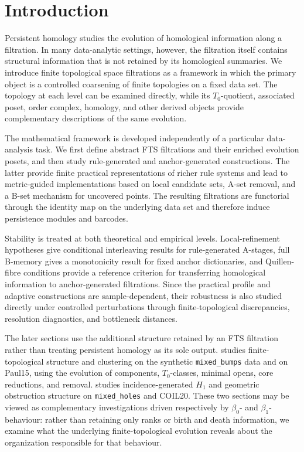 \documentclass[a4paper,11pt]{article}
\theoremstyle{definition}
\theoremstyle{remark}
\begin{document}
\tableofcontents

\section{Introduction}\label{sec:introduction}

Persistent homology studies the evolution of homological information along a filtration. In many data-analytic settings, however, the filtration itself contains structural information that is not retained by its homological summaries. We introduce finite topological space filtrations as a framework in which the primary object is a controlled coarsening of finite topologies on a fixed data set. The topology at each level can be examined directly, while its $T_0$-quotient, associated poset, order complex, homology, and other derived objects provide complementary descriptions of the same evolution.

The mathematical framework is developed independently of a particular data-analysis task. We first define abstract FTS filtrations and their enriched evolution posets, and then study rule-generated and anchor-generated constructions. The latter provide finite practical representations of richer rule systems and lead to metric-guided implementations based on local candidate sets, A-set removal, and a B-set mechanism for uncovered points. The resulting filtrations are functorial through the identity map on the underlying data set and therefore induce persistence modules and barcodes.

Stability is treated at both theoretical and empirical levels. Local-refinement hypotheses give conditional interleaving results for rule-generated A-stages, full B-memory gives a monotonicity result for fixed anchor dictionaries, and Quillen-fibre conditions provide a reference criterion for transferring homological information to anchor-generated filtrations. Since the practical profile and adaptive constructions are sample-dependent, their robustness is also studied directly under controlled perturbations through finite-topological discrepancies, resolution diagnostics, and bottleneck distances.

The later sections use the additional structure retained by an FTS filtration rather than treating persistent homology as its sole output.  studies finite-topological structure and clustering on the synthetic \texttt{mixed\_bumps} data and on Paul15, using the evolution of components, $T_0$-classes, minimal opens, core reductions, and removal.  studies incidence-generated $H_1$ and geometric obstruction structure on \texttt{mixed\_holes} and COIL20. These two sections may be viewed as complementary investigations driven respectively by $\beta_0$- and $\beta_1$-behaviour: rather than retaining only ranks or birth and death information, we examine what the underlying finite-topological evolution reveals about the organization responsible for that behaviour.
\end{document}
